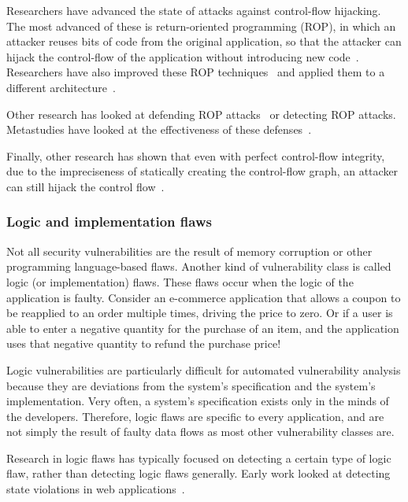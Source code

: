 \documentclass[11pt,letterpaper]{article}
\begin{document}
Researchers have advanced the state of attacks against control-flow
hijacking. The most advanced of these is return-oriented programming
(ROP), in which an attacker reuses bits of code from the original
application, so that the attacker can hijack the control-flow of the
application without introducing new code~\cite{Roemer2012,
  Bletsch2010, Tran2011}. Researchers have also improved these ROP
techniques~\cite{Checkoway2010, Buchanan2008, Kayaalp2012, Chen2012,
  Goktas2014, Schwartz2011} and applied them to a different
architecture~\cite{Davi2012}.

Other research has looked at defending ROP attacks~\cite{Pappas2012,
  Davi2009, Davi2011, Onarlioglu2010, Gupta2013, Pappas2012, Lu2011,
  Lu2011a, Homescu2012, Gokta2014, Cheng2014, Pappas2013, Snow2013,
  Hiser2012, Wartell2012} or detecting ROP
attacks\cite{Polychronakis2011}. Metastudies have looked at the
effectiveness of these defenses~\cite{Skowyra2013, Schuster2014}.

Finally, other research has shown that even with perfect control-flow
integrity, due to the impreciseness of statically creating the
control-flow graph, an attacker can still hijack the control
flow~\cite{Carlini2015, Schuster2015, Carlini2014, Davi2014}.

\subsubsection{Logic and implementation flaws}

Not all security vulnerabilities are the result of memory corruption
or other programming language-based flaws. Another kind of
vulnerability class is called logic (or implementation) flaws. These
flaws occur when the logic of the application is faulty. Consider an
e-commerce application that allows a coupon to be reapplied to an order
multiple times, driving the price to zero. Or if a user is able to
enter a negative quantity for the purchase of an item, and the
application uses that negative quantity to refund the purchase price!

Logic vulnerabilities are particularly difficult for automated
vulnerability analysis because they are deviations from the
system's specification and the system's implementation. Very often, a
system's specification exists only in the minds of the developers.
Therefore, logic flaws are specific to every application, and are not
simply the result of faulty data flows as most other vulnerability
classes are.

Research in logic flaws has typically focused on detecting a certain
type of logic flaw, rather than detecting logic flaws generally. Early
work looked at detecting state violations in web
applications~\cite{Cova2007}.
\end{document}
